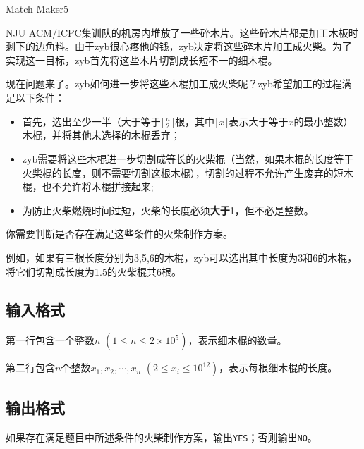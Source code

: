 \begin{Problem}{Match Maker}{5}

NJU ACM/ICPC集训队的机房内堆放了一些碎木片。这些碎木片都是加工木板时剩下的边角料。由于zyb很心疼他的钱，zyb决定将这些碎木片加工成火柴。为了实现这一目标，zyb首先将这些木片切割成长短不一的细木棍。

现在问题来了。zyb如何进一步将这些木棍加工成火柴呢？zyb希望加工的过程满足以下条件：

\begin{itemize}
\item 首先，选出至少一半（大于等于$\lceil \frac{n}{2} \rceil$根，其中$\lceil x \rceil$表示大于等于$x$的最小整数）木棍，并将其他未选择的木棍丢弃；
\item zyb需要将这些木棍进一步切割成等长的火柴棍（当然，如果木棍的长度等于火柴棍的长度，则不需要切割这根木棍），切割的过程不允许产生废弃的短木棍，也不允许将木棍拼接起来;
\item 为防止火柴燃烧时间过短，火柴的长度必须\textbf{大于}1，但不必是整数。
\end{itemize}

你需要判断是否存在满足这些条件的火柴制作方案。

例如，如果有三根长度分别为3,5,6的木棍，zyb可以选出其中长度为3和6的木棍，将它们切割成长度为1.5的火柴棍共6根。

\subsection*{输入格式}

第一行包含一个整数$n$ $(1 \leq n \leq 2 \times 10^5)$，表示细木棍的数量。

第二行包含$n$个整数$x_1, x_2, \cdots, x_n$ $(2 \leq x_i \leq 10^{12})$，表示每根细木棍的长度。

\subsection*{输出格式}

如果存在满足题目中所述条件的火柴制作方案，输出\texttt{YES}；否则输出\texttt{NO}。


\end{Problem}

